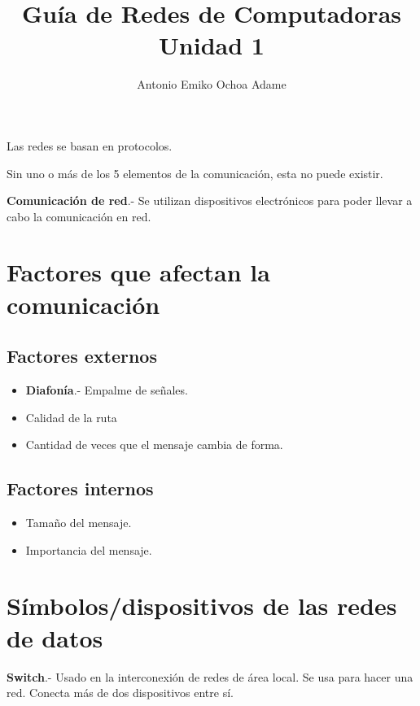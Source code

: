 \documentclass{article}
\begin{document}
\title{Guía de Redes de Computadoras Unidad 1}
\author{Antonio Emiko Ochoa Adame}
\maketitle

Las redes se basan en protocolos.
\vspace{1em}

Sin uno o más de los 5 elementos de la comunicación, esta no puede existir.
\vspace{1em}

\textbf{Comunicación de red}.- Se utilizan dispositivos electrónicos para poder
llevar a cabo la comunicación en red.
\vspace{1em}

\section{Factores que afectan la comunicación}

\subsection{Factores externos}

\begin{itemize}
	\item
	\textbf{Diafonía}.- Empalme de señales.
	\item
	Calidad de la ruta
	\item
	Cantidad de veces que el mensaje cambia de forma.
\end{itemize}

\subsection{Factores internos}

\begin{itemize}
	\item
	Tamaño del mensaje.
	\item
	Importancia del mensaje.
\end{itemize}

\section{Símbolos/dispositivos de las redes de datos}

\textbf{Switch}.- Usado en la interconexión de redes de área local. Se usa para
hacer una red. Conecta más de dos dispositivos entre sí.
\vspace{1em}
\end{document}
